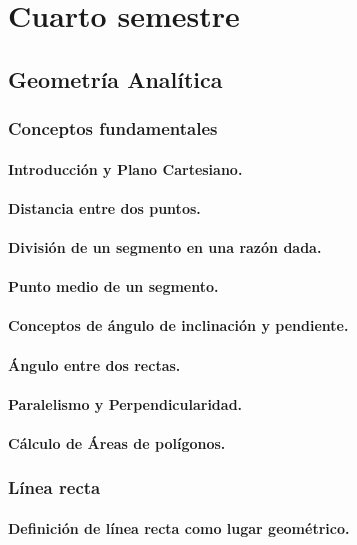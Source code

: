 \part{Cuarto semestre}
\chapter{Geometría Analítica}


\section{Conceptos fundamentales} %
\subsection{Introducción y Plano Cartesiano.}
\subsection{Distancia entre dos puntos.}
\subsection{División de un segmento en una razón dada.}
\subsection{Punto medio de un segmento.}
\subsection{Conceptos de ángulo de inclinación y pendiente.}
\subsection{Ángulo entre dos rectas.}
\subsection{Paralelismo y Perpendicularidad.}
\subsection{Cálculo de Áreas de polígonos.}

\section{Línea recta} %
\subsection{Definición de línea recta como lugar geométrico.}
